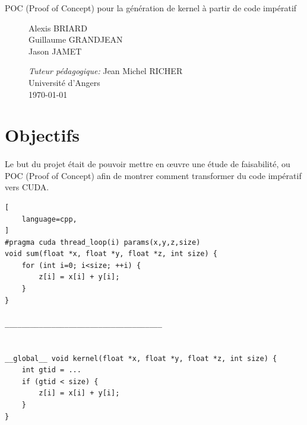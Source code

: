 \documentclass{article}
\begin{document}
\begin{titlepage}
\begin{center}
\begin{Huge}
			\end{Huge}
			\begin{Large}
				POC (Proof of Concept) pour la génération de kernel à partir de code impératif
			\end{Large}		
			 
		\end{center}
		
		
  		\begin{figure}[b]
  		 \begin{minipage}{0.4\textwidth}
			\begin{flushleft} \large
				Alexis BRIARD\\
				Guillaume GRANDJEAN\\
				Jason JAMET
    		\end{flushleft}
    		\end{minipage}
    		\begin{minipage}{0.6\textwidth}
			\begin{flushright} \large
				\emph{Tuteur pédagogique:} Jean Michel RICHER\\				
        		Université d'Angers\\
        		\today
    		\end{flushright}
    	\end{minipage}
		\end{figure}

    	
	\end{titlepage}



\newpage
\thispagestyle{empty}
\mbox{}
\setcounter{page}{0}
\glsresetall
\newpage
\tableofcontents
\newpage

	\section{Objectifs}

	\paragraph{}
	Le but du projet était de pouvoir mettre en œuvre une étude de faisabilité, ou POC (Proof of Concept) afin de montrer comment transformer du code impératif vers CUDA.
	
	\begin{lstlisting}[
    language=cpp,
]
#pragma cuda thread_loop(i) params(x,y,z,size) 
void sum(float *x, float *y, float *z, int size) { 
	for (int i=0; i<size; ++i) {
		z[i] = x[i] + y[i];
	}
}

_____________________________________


__global__ void kernel(float *x, float *y, float *z, int size) { 
	int gtid = ...
	if (gtid < size) {
		z[i] = x[i] + y[i];
	}
}
	
	\end{lstlisting}	
	
\end{document}
